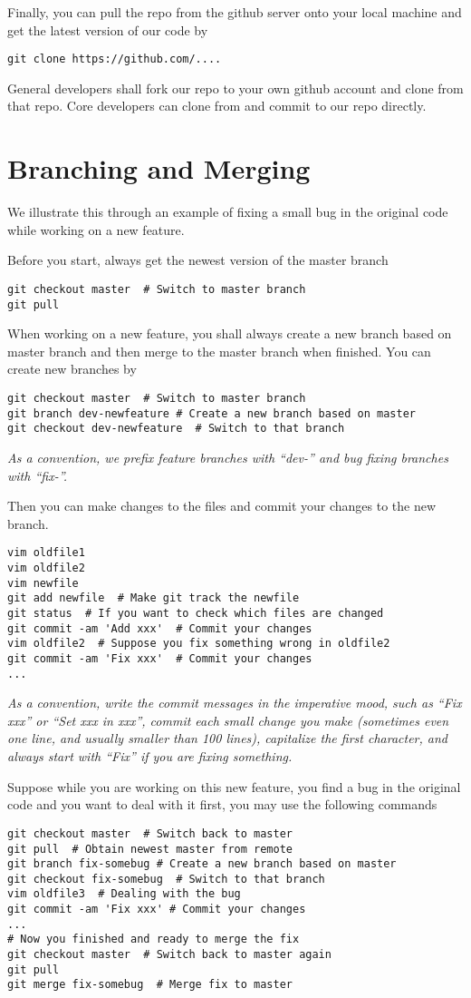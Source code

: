 \documentclass[runningheads,letterpaper]{llncs}
\begin{document}
Finally, you can pull the repo from the github server onto your local machine and get the latest version of our code by
\begin{verbatim}
git clone https://github.com/....
\end{verbatim}
General developers shall fork our repo to your own github account and clone from that repo.
Core developers can clone from and commit to our repo directly.

\section{Branching and Merging}
\label{sec:basic}
We illustrate this through an example of fixing a small bug in the original code while working on a new feature.

Before you start, always get the newest version of the master branch
\begin{verbatim}
git checkout master  # Switch to master branch
git pull
\end{verbatim}

When working on a new feature, you shall always create a new branch based on master branch and then merge to the master branch when finished.
You can create new branches by
\begin{verbatim}
git checkout master  # Switch to master branch
git branch dev-newfeature # Create a new branch based on master
git checkout dev-newfeature  # Switch to that branch
\end{verbatim}
{\it As a convention, we prefix feature branches with ``dev-'' and bug fixing branches with ``fix-''.}

Then you can make changes to the files and commit your changes to the new branch.
\begin{verbatim}
vim oldfile1
vim oldfile2
vim newfile
git add newfile  # Make git track the newfile
git status  # If you want to check which files are changed
git commit -am 'Add xxx'  # Commit your changes
vim oldfile2  # Suppose you fix something wrong in oldfile2
git commit -am 'Fix xxx'  # Commit your changes
...
\end{verbatim}
{\it As a convention,
write the commit messages in the imperative mood, such as ``Fix xxx'' or ``Set xxx in xxx'',
commit each small change you make (sometimes even one line, and usually smaller than 100 lines),
capitalize the first character,
and always start with ``Fix'' if you are fixing something.}

Suppose while you are working on this new feature, you find a bug in the original code and you want to deal with it first, you may use the following commands
\begin{verbatim}
git checkout master  # Switch back to master
git pull  # Obtain newest master from remote
git branch fix-somebug # Create a new branch based on master
git checkout fix-somebug  # Switch to that branch
vim oldfile3  # Dealing with the bug
git commit -am 'Fix xxx' # Commit your changes
...
# Now you finished and ready to merge the fix
git checkout master  # Switch back to master again
git pull
git merge fix-somebug  # Merge fix to master
\end{verbatim}
\end{document}
